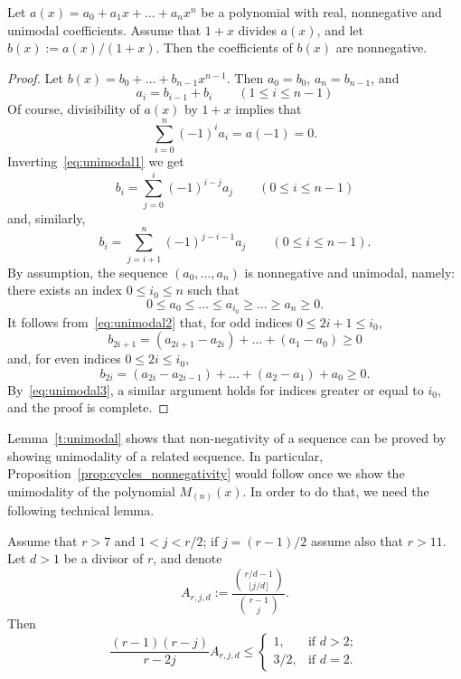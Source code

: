 \begin{lemma}\label{t:unimodal}
    Let $a(x) = a_0 + a_1 x + \ldots + a_n x^n$ be a polynomial with real, nonnegative and unimodal coefficients.
    Assume that $1+x$ divides $a(x)$, and let $b(x) := a(x)/(1+x)$.
    Then the coefficients of $b(x)$ are nonnegative.
\end{lemma}
	
\begin{proof}
    Let $b(x) = b_0 + \ldots + b_{n-1} x^{n-1}$.
    Then $a_0 = b_0$, $a_n = b_{n-1}$, and
    \begin{equation}\label{eq:unimodal1}
        a_i = b_{i-1} + b_i 
        \qquad (1 \le i \le n-1)
    \end{equation}
    Of course, divisibility of $a(x)$ by $1+x$ implies that
    \[
        \sum_{i=0}^{n} (-1)^i a_i = a(-1) = 0.
    \]
    Inverting~\eqref{eq:unimodal1} we get
    \begin{equation}\label{eq:unimodal2}
        b_i = \sum_{j=0}^i (-1)^{i-j} a_j
        \qquad (0 \le i \le n-1)
    \end{equation}
    and, similarly,
    \begin{equation}\label{eq:unimodal3}
        b_i = \sum_{j=i+1}^n (-1)^{j-i-1} a_j
        \qquad (0 \le i \le n-1).
    \end{equation}
    By assumption, the sequence $(a_0, \ldots, a_n)$ is nonnegative and unimodal, namely: 
    there exists an index $0 \le i_0 \le n$ such that
    \[
        0 \le a_0 \le \ldots \le a_{i_0} \ge \ldots \ge a_n \ge 0.
    \]
    It follows from~\eqref{eq:unimodal2} that, for odd indices $0 \le 2i+1 \le i_0$,
    \[
        b_{2i+1} = (a_{2i+1} - a_{2i}) + \ldots + (a_1 - a_0) \ge 0
    \]
    and, for even indices $0 \le 2i \le i_0$,
    \[
        b_{2i} = (a_{2i} - a_{2i-1}) + \ldots + (a_2 - a_1) + a_0 \ge 0.
    \]
    By~\eqref{eq:unimodal3}, a similar argument holds for 
    indices greater or equal to $i_0$, and the proof is complete.
\end{proof}
	
Lemma~\ref{t:unimodal} shows that non-negativity of a sequence can be proved by showing unimodality of a related sequence. In particular, Proposition~\ref{prop:cycles_nonnegativity} would follow once we show the unimodality of the polynomial $M_{(n)}(x)$.
In order to do that, we need the following technical lemma.

\begin{lemma}\label{lem:binomial_approx}
    Assume that $r > 7$ and $1 < j < r/2$;
    if $j = (r-1)/2$ assume also that $r > 11$.
    Let $d > 1$ be a divisor of $r$, and denote
	\[
	   A_{r,j,d} 
	   := \frac{\displaystyle\binom{r/d - 1} {\lfloor j/d \rfloor}} {\displaystyle\binom{r-1}{j}}.
	\]
	Then
	\[
	\frac{(r-1)(r-j)}{r-2j} A_{r,j,d} \le 
	\begin{cases}
	        1, &\text{if } d>2; \\
	        3/2, &\text{if } d=2.
	\end{cases}
	\]
\end{lemma}
	
